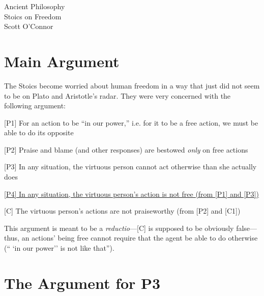 \documentclass[11pt]{article}
\begin{document}
\thispagestyle{empty}
\begin{center} \LARGE{Ancient Philosophy\\ Stoics on Freedom}\\ \vspace*{2mm}
\large{Scott O'Connor}\end{center}
\thispagestyle{empty}\vspace*{3mm}

\section*{Main Argument}

\noindent The Stoics become worried about human freedom in a way that just did not seem to be on Plato and Aristotle's radar. They were very concerned with the following argument:
\vspace*{2mm}

[P1] For an action to be ``in our power,'' i.e. for it to be a free action, we must be able to do its opposite\vspace*{1mm}

[P2] Praise and blame (and other responses) are bestowed \emph{only} on free actions
\vspace*{1mm}

[P3] In any situation, the virtuous person cannot act otherwise than she actually does
\vspace*{1mm}

\underline{[P4] In any situation, the virtuous person's action is not free (from [P1] and [P3])}
\vspace*{1mm}

[C] The virtuous person's actions are not praiseworthy (from [P2] and [C1])
\vspace*{2mm}


\vspace*{2mm}

\noindent This argument is meant to be a \emph{reductio}---[C] is supposed to be obviously false---thus, an actions' being free cannot require that the agent be able to do otherwise (`` `in our power'' is not like that'').

\section*{The Argument for P3}
\end{document}
